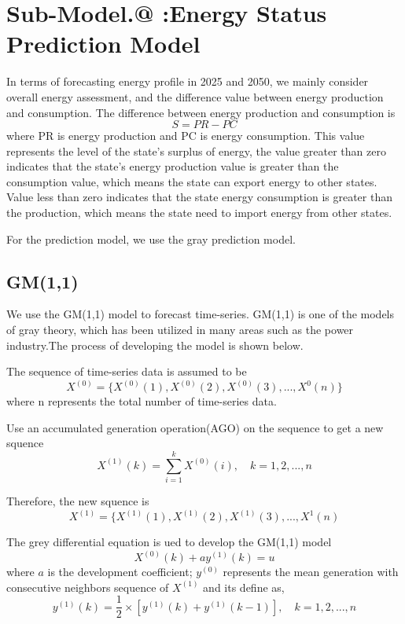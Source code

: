 \documentclass{mcmthesis}
\makeatletter
\newcommand{\Rmnum}[1]{\expandafter\@slowromancap\romannumeral #1@}
\makeatother
\begin{document}
\section{Sub-Model.\Rmnum{2} :\quad Energy Status Prediction Model}
In terms of forecasting energy profile in 2025 and 2050,  we mainly consider overall energy assessment, and the difference value between energy production and consumption. The difference between energy production and consumption is
\begin{equation}
  S = PR - PC
\end{equation}
where PR is energy production and PC is energy consumption. This value represents the level of the state's surplus of energy, the value greater than zero indicates that the state's energy production value is greater than the consumption value, which means the state can export energy to other states. Value less than zero indicates that the state energy consumption is greater than the production, which means the state need to import energy from other states.

For the prediction model, we use the gray prediction model.
\subsection{GM(1,1)}
We use the GM(1,1) model to forecast time-series. GM(1,1) is one of the models of gray theory, which has been 
utilized in many areas such as the power industry\cite{}.The process of developing the model is shown below.
    
The sequence of time-series data is assumed to be
\begin{equation}
    X^{(0)}=\{X^{(0)}(1),X^{(0)}(2),X^{(0)}(3),...,X^{0}(n)\}
\end{equation}
where n represents the total number of time-series data.

    Use an accumulated generation operation(AGO) on the sequence to get a new squence
\begin{equation}
  X^{(1)}(k) = \sum^k_{i=1}X^{(0)}(i),\quad k=1,2,...,n
\end{equation}

Therefore, the new squence is
\begin{equation}
  X^{(1)}=\{X^{(1)}(1),X^{(1)}(2),X^{(1)}(3),...,X^{1}(n)
\end{equation}

The grey differential equation is ued to develop the GM(1,1) model
\begin{equation}
  X^{(0)}(k) + ay^{(1)}(k)=u
\end{equation}
where $a$ is the development coefficient; $y^{(0)}$ represents the 
mean generation with consecutive neighbors sequence of $X^{(1)}$ and its define as,
\begin{equation}
  y^{(1)}(k) = \frac12\times\left[y^{(1)}(k) + y^{(1)}(k-1)\right],\quad k=1,2,...,n
\end{equation}
\end{document}
